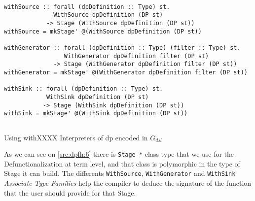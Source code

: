 \begin{listing}[H]
  \begin{verbatim}

withSource :: forall (dpDefinition :: Type) st. 
              WithSource dpDefinition (DP st) 
            -> Stage (WithSource dpDefinition (DP st))
withSource = mkStage' @(WithSource dpDefinition (DP st))

withGenerator :: forall (dpDefinition :: Type) (filter :: Type) st. 
                 WithGenerator dpDefinition filter (DP st) 
              -> Stage (WithGenerator dpDefinition filter (DP st))
withGenerator = mkStage' @(WithGenerator dpDefinition filter (DP st))

withSink :: forall (dpDefinition :: Type) st. 
            WithSink dpDefinition (DP st) 
           -> Stage (WithSink dpDefinition (DP st))
withSink = mkStage' @(WithSink dpDefinition (DP st))


  \end{verbatim}
  \caption{Using withXXXX Interpreters of \acrshort{dp} encoded in $G_{dsl}$}
  \label{src:dpfh:6}
\end{listing}

As we can see on \autoref{src:dpfh:6} there is \texttt{Stage *} class type that we use for 
the Defunctionalization at term level, and that class is polymorphic in the type of Stage it can build.
The differents \texttt{WithSource}, \texttt{WithGenerator} and \texttt{WithSink}
\emph{Associate Type Families} help the compiler to deduce the signature of the function that the user should provide for that Stage.


